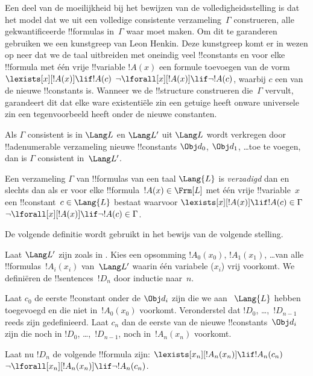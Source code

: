 \documentclass[../../../include/open-logic-section]{subfiles}
\begin{document}


\begin{explain}
Een deel van de moeilijkheid bij het bewijzen van de volledigheidsstelling
is dat het model dat we uit een volledige consistente verzameling~$\Gamma$
construeren, alle gekwantificeerde !!{formula}s in~$\Gamma$ waar moet
maken. Om dit te garanderen gebruiken we een kunstgreep van Leon Henkin.
Deze kunstgreep komt er in wezen op neer dat we de taal uitbreiden met
oneindig veel !!{constant}s en voor elke !!{formula} met één vrije
!!{variable} $!A(x)$ een formule toevoegen van de vorm
      {$\lexists[x][!A(x)] \lif !A(c)$}
      {$\lnot\lforall[x][!A(x)] \lif \lnot !A(c)$},
waarbij $c$ een van de nieuwe !!{constant}s is. Wanneer we de
!!{structure} construeren die~$\Gamma$ vervult, garandeert dit dat elke
{ware existentiële zin een getuige heeft}
{onware universele zin een tegenvoorbeeld heeft}
onder de nieuwe constanten.
\end{explain}

\begin{prop}
Als $\Gamma$ consistent is in $\Lang L$ en $\Lang L'$ uit $\Lang L$
wordt verkregen door !!a{denumerable} verzameling nieuwe
!!{constant}s $\Obj d_0$, $\Obj d_1$, \dots toe te voegen, dan is
$\Gamma$ consistent in~$\Lang L'$.
\end{prop}

\begin{defn}
Een verzameling $\Gamma$ van !!{formula}s van een taal $\Lang {L}$ is
\emph{verzadigd} dan en slechts dan als er voor elke
!!{formula}~$!A(x) \in \Frm[L]$ met één vrije !!{variable}~$x$ een
!!{constant}~$c \in \Lang{L}$ bestaat waarvoor
      {$\lexists[x][!A(x)] \lif !A(c) \in \Gamma$}
      {$\lnot\lforall[x][!A(x)] \lif \lnot !A(c) \in \Gamma$}.
\end{defn}

De volgende definitie wordt gebruikt in het bewijs van de volgende
stelling.

\begin{defn}
Laat $\Lang L'$ zijn zoals in . Kies een opsomming
$!A_0(x_0)$, $!A_1(x_1)$, \dots van alle !!{formula}s~$!A_i(x_i)$
van~$\Lang L'$ waarin één variabele ($x_i$) vrij voorkomt. We definiëren
de !!{sentence}s~$!D_n$ door inductie naar~$n$.

Laat $c_0$ de eerste !!{constant} onder de $\Obj d_i$ zijn die we aan
~$\Lang{L}$ hebben toegevoegd en die niet in~$!A_0(x_0)$ voorkomt.
Veronderstel dat $!D_0$, \dots,~$!D_{n-1}$ reeds zijn gedefinieerd. Laat
$c_n$ dan de eerste van de nieuwe !!{constant}s~$\Obj d_i$ zijn die noch
in $!D_0$, \dots,~$!D_{n-1}$, noch in~$!A_n(x_n)$ voorkomt.

Laat nu $!D_{n}$ de volgende !!{formula} zijn: 
{$\lexists[x_{n}][!A_{n}(x_{n})] \lif
  !A_{n}(c_{n})$}{$\lnot\lforall[x_{n}][!A_{n}(x_{n})] \lif \lnot
  !A_{n}(c_{n})$}.
\end{defn}
\end{document}
